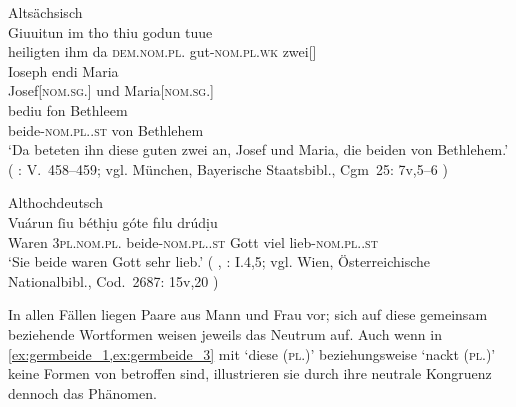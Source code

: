 \begin{exe}
\begin{xlist}
	\ex \label{ex:germbeide_4}
		\langinfo%
			{Altsächsisch}
			{}
			{\cite[nach][35]{sievers1878}}\\
		\gll Giuuitun im tho thiu godun tuue \\
			heiligten ihm da \textsc{dem.nom.pl.\NeutMF} gut-\textsc{nom.pl.wk}
			zwei[\textsc{\NeutMF}] \\
		\gll Ioseph endi Maria \\
			Josef[\textsc{nom.sg.\MascM}] und Maria[\textsc{nom.sg.\FemF}] \\
		\gll bediu fon Bethleem \\
			beide-\textsc{nom.pl.\NeutMF.st} von Bethlehem \\
		\trans `Da beteten ihn diese guten zwei an, Josef und Maria, die beiden
			von Bethlehem.'
			(%
				: V.~458--459;
				vgl. München, Bayerische Staatsbibl., Cgm~25: 7v,5--6%
			)

	\ex \label{ex:germbeide_5}
		\langinfo%
			{Althochdeutsch}
			{}
			{\cite[nach][15v]{kleiberhellgardt2004}}\\
		\gll Vuárun ſiu béthịu góte fılu drúdịu \\
			Waren \textsc{3pl.nom.pl.\NeutMF} beide-\textsc{nom.pl.\NeutMF.st}
				Gott viel lieb-\textsc{nom.pl.\NeutMF.st} \\
		\trans `Sie beide  waren Gott sehr lieb.'
			(%
				, : I.4,5;
				vgl. Wien, Österreichische Nationalbibl., Cod.~2687: 15v,20%
			)
		\\
	\end{xlist}
\end{exe}

In allen Fällen liegen Paare aus Mann und Frau vor; sich auf diese gemeinsam
beziehende Wortformen weisen jeweils das Neutrum auf. Auch wenn in
\cref{ex:germbeide_1,ex:germbeide_3} mit  `diese
(\textsc{pl.\NeutMF})' beziehungsweise  `nackt
(\textsc{pl.\NeutMF})' keine Formen von  betroffen sind,
illustrieren sie durch ihre neutrale Kongruenz dennoch das Phänomen.

